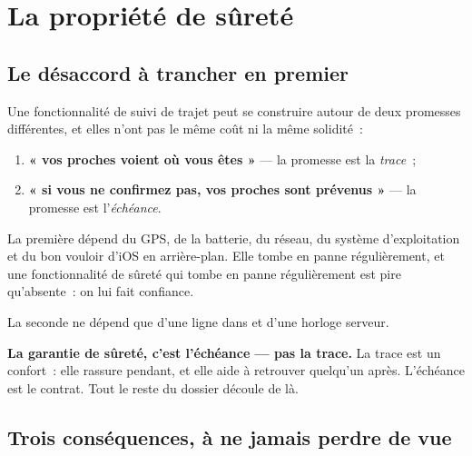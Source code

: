 
\chapter{La propriété de sûreté}

\section{Le désaccord à trancher en premier}

Une fonctionnalité de suivi de trajet peut se construire autour de deux promesses
différentes, et elles n'ont pas le même coût ni la même solidité~:

\begin{enumerate}[leftmargin=1.6em]
  \item \textbf{« vos proches voient où vous êtes »} --- la promesse est la \emph{trace}~;
  \item \textbf{« si vous ne confirmez pas, vos proches sont prévenus »} --- la promesse est
        l'\emph{échéance}.
\end{enumerate}

La première dépend du GPS, de la batterie, du réseau, du système d'exploitation et du bon
vouloir d'iOS en arrière-plan. Elle tombe en panne régulièrement, et une fonctionnalité de
sûreté qui tombe en panne régulièrement est pire qu'absente~: on lui fait confiance.

La seconde ne dépend que d'une ligne dans  et d'une horloge serveur.

\begin{note}
\textbf{La garantie de sûreté, c'est l'échéance --- pas la trace.} La trace est un confort~:
elle rassure pendant, et elle aide à retrouver quelqu'un après. L'échéance est le contrat.
Tout le reste du dossier découle de là.
\end{note}

\section{Trois conséquences, à ne jamais perdre de vue}

